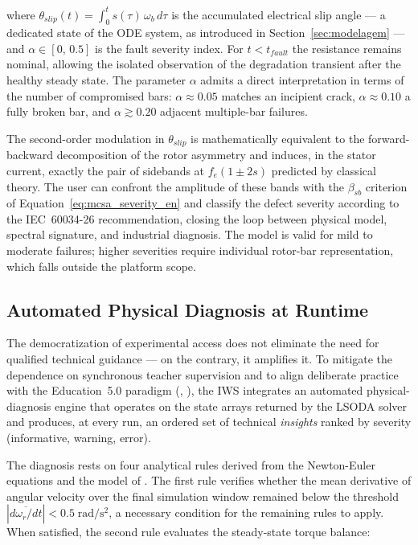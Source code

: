 \documentclass[a4paper]{ifacconf}
\begin{document}
\noindent where $\theta_{slip}(t) = \int_{0}^{t}\!s(\tau)\,\omega_b\,d\tau$ is the accumulated electrical slip angle --- a dedicated state of the ODE system, as introduced in Section~\ref{sec:modelagem} --- and $\alpha \in [0,\,0.5]$ is the fault severity index. For $t < t_{fault}$ the resistance remains nominal, allowing the isolated observation of the degradation transient after the healthy steady state. The parameter $\alpha$ admits a direct interpretation in terms of the number of compromised bars: $\alpha \approx 0.05$ matches an incipient crack, $\alpha \approx 0.10$ a fully broken bar, and $\alpha \gtrsim 0.20$ adjacent multiple-bar failures.

The second-order modulation in $\theta_{slip}$ is mathematically equivalent to the forward-backward decomposition of the rotor asymmetry and induces, in the stator current, exactly the pair of sidebands at $f_e(1 \pm 2s)$ predicted by classical theory. The user can confront the amplitude of these bands with the $\beta_{sb}$ criterion of Equation~\ref{eq:mcsa_severity_en} and classify the defect severity according to the IEC~60034-26 recommendation, closing the loop between physical model, spectral signature, and industrial diagnosis. The model is valid for mild to moderate failures; higher severities require individual rotor-bar representation, which falls outside the platform scope.

\subsection{Automated Physical Diagnosis at Runtime}
\label{subsec:diag_auto_en}

The democratization of experimental access does not eliminate the need for qualified technical guidance --- on the contrary, it amplifies it. To mitigate the dependence on synchronous teacher supervision and to align deliberate practice with the Education~5.0 paradigm (\citeauthor{cordeiro2024educacao}, \citeyear{cordeiro2024educacao}), the IWS integrates an automated physical-diagnosis engine that operates on the state arrays returned by the LSODA solver and produces, at every run, an ordered set of technical \textit{insights} ranked by severity (informative, warning, error).

The diagnosis rests on four analytical rules derived from the Newton-Euler equations and the model of \cite{KrauseThomas}. The first rule verifies whether the mean derivative of angular velocity over the final simulation window remained below the threshold $|\overline{d\omega_r/dt}| < 0.5\;\mathrm{rad/s^2}$, a necessary condition for the remaining rules to apply. When satisfied, the second rule evaluates the steady-state torque balance:
\end{document}
